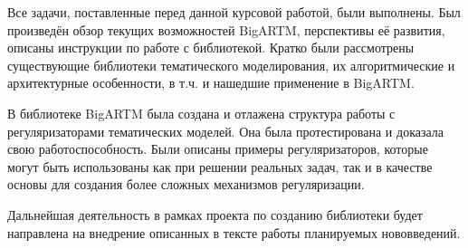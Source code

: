 Все задачи, поставленные перед данной курсовой работой, были выполнены. Был произведён обзор текущих возможностей BigARTM, перспективы её развития, описаны инструкции по работе с библиотекой. Кратко были рассмотрены существующие библиотеки тематического моделирования, их алгоритмические и архитектурные особенности, в т.ч. и нашедшие применение в BigARTM. 

В библиотеке BigARTM была создана и отлажена структура работы с регуляризаторами тематических моделей. Она была протестирована и доказала свою работоспособность. Были описаны примеры регуляризаторов, которые могут быть использованы как при решении реальных задач, так и в качестве основы для создания более сложных механизмов регуляризации.

Дальнейшая деятельность в рамках проекта по созданию библиотеки будет направлена на внедрение описанных в тексте работы планируемых нововведений.